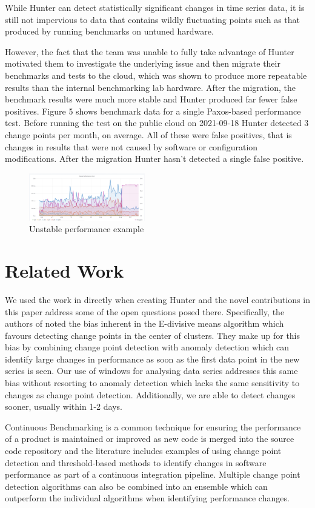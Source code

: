 \documentclass[sigconf]{acmart}
\begin{document}
While Hunter can detect statistically significant changes in time series data, it is still not impervious to data that contains wildly fluctuating points such as that produced by running benchmarks on untuned hardware.

However, the fact that the team was unable to fully take advantage of Hunter motivated them to investigate
the underlying issue and then migrate their benchmarks and tests to the cloud, which was shown to
produce more repeatable results than the internal benchmarking lab hardware. After the migration,
the benchmark results were much more stable and Hunter produced far fewer false positives. Figure 5 shows benchmark data for a single Paxos-based performance test. Before running the test on the public cloud on 2021-09-18 Hunter detected 3 change points per month, on average. All of these were false positives, that is changes in results that were not caused by software or configuration modifications. After the migration Hunter hasn’t detected a single false positive.

\begin{figure}
	\includegraphics[width=0.45\textwidth]{paxos}
	\caption{Unstable performance example}
\end{figure}

\section{Related Work}
We used the work in \cite{MONGOCPD} directly when creating Hunter and the novel contributions in this paper address some of the open questions posed there. Specifically, the authors of \cite{MONGOCPD} noted the bias inherent in the E-divisive means algorithm which favours detecting change points in the center of clusters. They make up for this bias by combining change point detection with anomaly detection which can identify large changes in performance as soon as the first data point in the new series is seen. Our use of windows for analysing data series addresses this same bias without resorting to anomaly detection which lacks the same sensitivity to changes as change point detection. Additionally, we are able to detect changes sooner, usually within 1-2 days.

Continuous Benchmarking \cite{CONTINUOUSBENCHMARKING} is a common technique for ensuring the performance of a product is maintained or improved as new code is merged into the source code repository and the literature includes examples of using change point detection \cite{MONGOCYCLE} and threshold-based methods to identify changes in software performance \cite{SAP} as part of a continuous integration pipeline. Multiple change point detection algorithms can also be combined into an ensemble which can outperform the individual algorithms \cite{MSTHESIS} when identifying performance changes.
\end{document}
